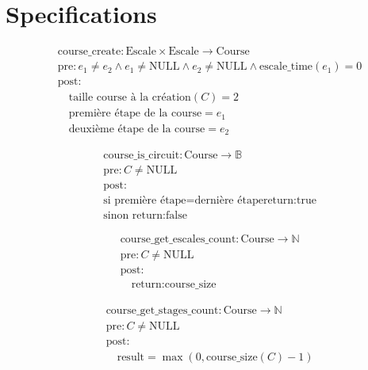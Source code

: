 \section{Specifications}\label{specifications}

\[
\begin{aligned}
&\text{course\_create}: \text{Escale} \times \text{Escale} \to \text{Course} \\
&\text{pre}: e_1 \neq e_2 \land e_1 \neq \text{NULL} \land e_2 \neq \text{NULL} \land \text{escale\_time}(e_1) = 0 \\
&\text{post}: \\
&\quad \text{taille course à la création}(C) = 2 \\
&\quad \text{première étape de la course} = e_1 \\
&\quad \text{deuxième  étape de la course} = e_2
\end{aligned}
\]





\[
\begin{aligned}
&\text{course\_is\_circuit}: \text{Course} \to \mathbb{B} \\
&\text{pre}: C \neq \text{NULL} \\
&\text{post}: \\
&\text{si } \text{première étape} = \text{dernière étape} \text{return:true} \\
&\text{sinon return:false} 
\end{aligned}
\]




\[
\begin{aligned}
&\text{course\_get\_escales\_count}: \text{Course} \to \mathbb{N} \\
&\text{pre}: C \neq \text{NULL} \\
&\text{post}: \\
&\quad \text{return:} \text{course\_size}
\end{aligned}
\]





\[
\begin{aligned}
&\text{course\_get\_stages\_count}: \text{Course} \to \mathbb{N} \\
&\text{pre}: C \neq \text{NULL} \\
&\text{post}: \\
&\quad \text{result} = \max(0, \text{course\_size}(C) - 1)
\end{aligned}
\]





